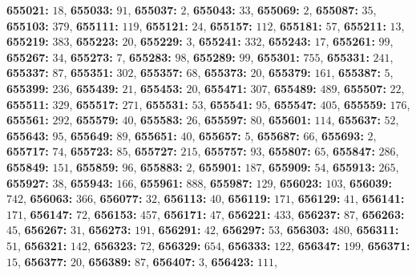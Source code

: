 \textsf{\bfseries 655021:} $18$, \textsf{\bfseries 655033:} $91$, \textsf{\bfseries 655037:} $2$, \textsf{\bfseries 655043:} $33$, \textsf{\bfseries 655069:} $2$, \textsf{\bfseries 655087:} $35$, \textsf{\bfseries 655103:} $379$, \textsf{\bfseries 655111:} $119$, \textsf{\bfseries 655121:} $24$, \textsf{\bfseries 655157:} $112$, \textsf{\bfseries 655181:} $57$, \textsf{\bfseries 655211:} $13$, \textsf{\bfseries 655219:} $383$, \textsf{\bfseries 655223:} $20$, \textsf{\bfseries 655229:} $3$, \textsf{\bfseries 655241:} $332$, \textsf{\bfseries 655243:} $17$, \textsf{\bfseries 655261:} $99$, \textsf{\bfseries 655267:} $34$, \textsf{\bfseries 655273:} $7$, \textsf{\bfseries 655283:} $98$, \textsf{\bfseries 655289:} $99$, \textsf{\bfseries 655301:} $755$, \textsf{\bfseries 655331:} $241$, \textsf{\bfseries 655337:} $87$, \textsf{\bfseries 655351:} $302$, \textsf{\bfseries 655357:} $68$, \textsf{\bfseries 655373:} $20$, \textsf{\bfseries 655379:} $161$, \textsf{\bfseries 655387:} $5$, \textsf{\bfseries 655399:} $236$, \textsf{\bfseries 655439:} $21$, \textsf{\bfseries 655453:} $20$, \textsf{\bfseries 655471:} $307$, \textsf{\bfseries 655489:} $489$, \textsf{\bfseries 655507:} $22$, \textsf{\bfseries 655511:} $329$, \textsf{\bfseries 655517:} $271$, \textsf{\bfseries 655531:} $53$, \textsf{\bfseries 655541:} $95$, \textsf{\bfseries 655547:} $405$, \textsf{\bfseries 655559:} $176$, \textsf{\bfseries 655561:} $292$, \textsf{\bfseries 655579:} $40$, \textsf{\bfseries 655583:} $26$, \textsf{\bfseries 655597:} $80$, \textsf{\bfseries 655601:} $114$, \textsf{\bfseries 655637:} $52$, \textsf{\bfseries 655643:} $95$, \textsf{\bfseries 655649:} $89$, \textsf{\bfseries 655651:} $40$, \textsf{\bfseries 655657:} $5$, \textsf{\bfseries 655687:} $66$, \textsf{\bfseries 655693:} $2$, \textsf{\bfseries 655717:} $74$, \textsf{\bfseries 655723:} $85$, \textsf{\bfseries 655727:} $215$, \textsf{\bfseries 655757:} $93$, \textsf{\bfseries 655807:} $65$, \textsf{\bfseries 655847:} $286$, \textsf{\bfseries 655849:} $151$, \textsf{\bfseries 655859:} $96$, \textsf{\bfseries 655883:} $2$, \textsf{\bfseries 655901:} $187$, \textsf{\bfseries 655909:} $54$, \textsf{\bfseries 655913:} $265$, \textsf{\bfseries 655927:} $38$, \textsf{\bfseries 655943:} $166$, \textsf{\bfseries 655961:} $888$, \textsf{\bfseries 655987:} $129$, \textsf{\bfseries 656023:} $103$, \textsf{\bfseries 656039:} $742$, \textsf{\bfseries 656063:} $366$, \textsf{\bfseries 656077:} $32$, \textsf{\bfseries 656113:} $40$, \textsf{\bfseries 656119:} $171$, \textsf{\bfseries 656129:} $41$, \textsf{\bfseries 656141:} $171$, \textsf{\bfseries 656147:} $72$, \textsf{\bfseries 656153:} $457$, \textsf{\bfseries 656171:} $47$, \textsf{\bfseries 656221:} $433$, \textsf{\bfseries 656237:} $87$, \textsf{\bfseries 656263:} $45$, \textsf{\bfseries 656267:} $31$, \textsf{\bfseries 656273:} $191$, \textsf{\bfseries 656291:} $42$, \textsf{\bfseries 656297:} $53$, \textsf{\bfseries 656303:} $480$, \textsf{\bfseries 656311:} $51$, \textsf{\bfseries 656321:} $142$, \textsf{\bfseries 656323:} $72$, \textsf{\bfseries 656329:} $654$, \textsf{\bfseries 656333:} $122$, \textsf{\bfseries 656347:} $199$, \textsf{\bfseries 656371:} $15$, \textsf{\bfseries 656377:} $20$, \textsf{\bfseries 656389:} $87$, \textsf{\bfseries 656407:} $3$, \textsf{\bfseries 656423:} $111$, 
